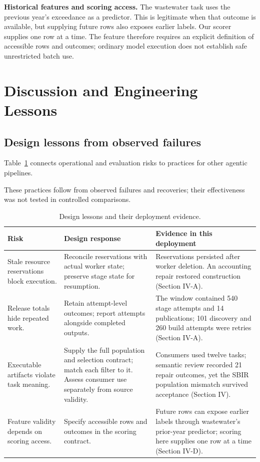 \documentclass[conference,10pt,letterpaper]{IEEEtran}
\begin{document}
\textbf{Historical features and scoring access.} The wastewater task uses the previous year's exceedance as a predictor. This is legitimate when that outcome is available, but supplying future rows also exposes earlier labels. Our scorer supplies one row at a time. The feature therefore requires an explicit definition of accessible rows and outcomes; ordinary model execution does not establish safe unrestricted batch use.

\section{Discussion and Engineering Lessons}
\subsection{Design lessons from observed failures}
Table~\ref{tab:lessons} connects operational and evaluation risks to practices for other agentic pipelines.

\begin{table}[t]
\caption{Design lessons and their deployment evidence.}
\label{tab:lessons}
\centering\small
\begin{minipage}{\textwidth}
These practices follow from observed failures and recoveries; their effectiveness was not tested in controlled comparisons.\par\smallskip
\begin{tabularx}{\textwidth}{@{}>{\raggedright\arraybackslash}p{}>{\raggedright\arraybackslash}p{}>{\raggedright\arraybackslash}X@{}}
\toprule
Risk & Design response & Evidence in this deployment \\\midrule
Stale resource reservations block execution. & Reconcile reservations with actual worker state; preserve stage state for resumption. & Reservations persisted after worker deletion. An accounting repair restored construction (Section IV-A). \\\addlinespace
Release totals hide repeated work. & Retain attempt-level outcomes; report attempts alongside completed outputs. & The window contained 540 stage attempts and 14 publications; 101 discovery and 260 build attempts were retries (Section IV-A). \\\addlinespace
Executable artifacts violate task meaning. & Supply the full population and selection contract; match each filter to it. Assess consumer use separately from source validity. & Consumers used twelve tasks; semantic review recorded 21 repair outcomes, yet the SBIR population mismatch survived acceptance (Section IV). \\\addlinespace
Feature validity depends on scoring access. & Specify accessible rows and outcomes in the scoring contract. & Future rows can expose earlier labels through wastewater's prior-year predictor; scoring here supplies one row at a time (Section IV-D). \\\bottomrule
\end{tabularx}
\end{minipage}
\end{table}
\end{document}
